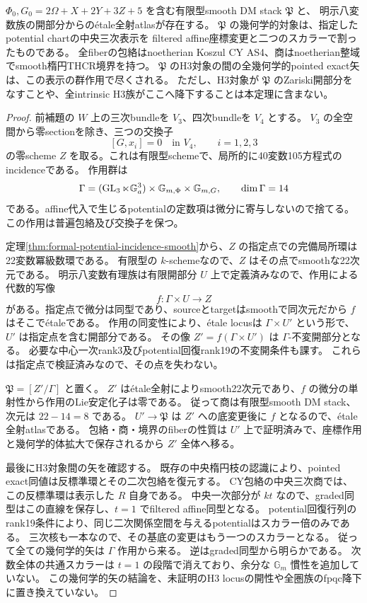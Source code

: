 \begin{theorem}\label{thm:presentation-DM-eight}
$\Phi_0,G_0=2\Omega+X+2Y+3Z+5$ を含む有限型smooth DM stack $\mathfrak P$ と、
明示八変数族の開部分からの\'{e}tale全射atlasが存在する。
$\mathfrak P$ の幾何学的対象は、指定したpotential chartの中央三次表示を
filtered affine座標変更と二つのスカラーで割ったものである。
全fiberの包絡はnoetherian Koszul CY AS4、商はnoetherian整域でsmooth楕円THCR境界を持つ。
$\mathfrak P$ のH3対象の間の全幾何学的pointed exact矢は、この表示の群作用で尽くされる。
ただし、H3対象が $\mathfrak P$ のZariski開部分をなすことや、全intrinsic H3族がここへ降下することは本定理に含まない。
\end{theorem}
\begin{proof}
前補題の $W$ 上の三次bundleを $V_3$、四次bundleを $V_4$ とする。
$V_3$ の全空間から零sectionを除き、三つの交換子
\[
 [G,x_i]=0\quad\text{in }V_4,\qquad i=1,2,3
\]
の零scheme $Z$ を取る。これは有限型schemeで、局所的に40変数105方程式のincidenceである。
作用群は
\[
 \Gamma=(\operatorname{GL}_3\ltimes\mathbb G_a^3)\times\mathbb G_{m,\Phi}\times\mathbb G_{m,G},
 \qquad\dim\Gamma=14
\]
である。affine代入で生じるpotentialの定数項は微分に寄与しないので捨てる。
この作用は普遍包絡及び交換子を保つ。

定理\ref{thm:formal-potential-incidence-smooth}から、$Z$ の指定点での完備局所環は22変数冪級数環である。
有限型の $k$-schemeなので、$Z$ はその点でsmoothな22次元である。
明示八変数有理族は有限開部分 $U$ 上で定義済みなので、作用による代数的写像
\[
 f:\Gamma\times U\longrightarrow Z
\]
がある。指定点で微分は同型であり、sourceとtargetはsmoothで同次元だから $f$ はそこで\'{e}taleである。
作用の同変性により、\'{e}tale locusは $\Gamma\times U'$ という形で、$U'$ は指定点を含む開部分である。
その像 $Z'=f(\Gamma\times U')$ は $\Gamma$-不変開部分となる。
必要な中心一次rank3及びpotential回復rank19の不変開条件も課す。
これらは指定点で検証済みなので、その点を失わない。

$\mathfrak P=[Z'/\Gamma]$ と置く。
$Z'$ は\'{e}tale全射によりsmooth22次元であり、$f$ の微分の単射性から作用のLie安定化子は零である。
従って商は有限型smooth DM stack、次元は $22-14=8$ である。
$U'\to\mathfrak P$ は $Z'$ への底変更後に $f$ となるので、\'{e}tale全射atlasである。
包絡・商・境界のfiberの性質は $U'$ 上で証明済みで、座標作用と幾何学的体拡大で保存されるから $Z'$ 全体へ移る。

最後にH3対象間の矢を確認する。
既存の中央楕円枝の認識により、pointed exact同値は反標準環とその二次包絡を復元する。
CY包絡の中央三次商では、この反標準環は表示した $R$ 自身である。
中央一次部分が $kt$ なので、graded同型はこの直線を保存し、$t=1$ でfiltered affine同型となる。
potential回復行列のrank19条件により、同じ二次関係空間を与えるpotentialはスカラー倍のみである。
三次核も一本なので、その基底の変更はもう一つのスカラーとなる。
従って全ての幾何学的矢は $\Gamma$ 作用から来る。
逆はgraded同型から明らかである。
次数全体の共通スカラーは $t=1$ の段階で消えており、余分な $\mathbb G_m$ 慣性を追加していない。
この幾何学的矢の結論を、未証明のH3 locusの開性や全圏族のfpqc降下に置き換えていない。
\end{proof}
